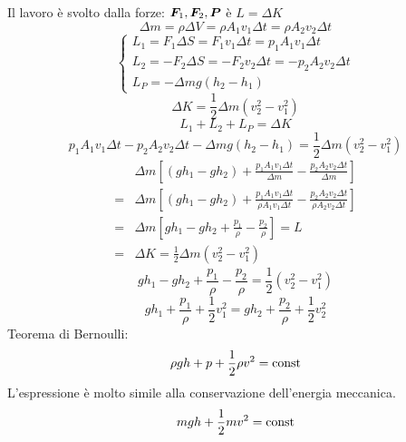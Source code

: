 Il lavoro è svolto dalla forze: $\boldsymbol{F}_1, \boldsymbol{F}_2, \boldsymbol{P}$ è $L=\Delta K$
\begin{equation*}\Delta m=\rho \Delta V=\rho A_1 v_1\Delta t=\rho A_2 v_2 \Delta t\end{equation*}
\begin{equation*}
\left\{
        \begin{array}{lll}
        L_1=F_1\Delta S=F_1v_1\Delta t=p_1A_1v_1\Delta t\\
        L_2=-F_2\Delta S=-F_2v_2\Delta t=-p_2A_2v_2\Delta t\\
        L_P=-\Delta mg(h_2-h_1)
        \end{array}
\right.
\end{equation*}
\begin{equation*}\Delta K=\frac{1}{2}\Delta m(v_2^2-v_1^2)\end{equation*}
\begin{equation*}L_1+L_2+L_P=\Delta K\end{equation*}
\begin{equation*}p_1A_1v_1\Delta t-p_2A_2v_2\Delta t-\Delta mg(h_2-h_1)=\frac{1}{2}\Delta m(v_2^2-v_1^2)\end{equation*}
\begin{align*}
&\Delta m\left[\left(gh_1-gh_2\right)+\frac{p_1A_1v_1\Delta t}{\Delta m}-\frac{p_2A_2v_2\Delta t}{\Delta m}\right]\\
=&\Delta m\left[\left(gh_1-gh_2\right)+\frac{p_1A_1v_1\Delta t}{\rho A_1v_1\Delta t}-\frac{p_2A_2v_2\Delta t}{\rho A_2v_2\Delta t}\right]\\
=&\Delta m\left[gh_1-gh_2+\frac{p_1}{\rho}-\frac{p_2}{\rho}\right]=L\\
=&\Delta K=\frac{1}{2}\Delta m(v_2^2-v_1^2)
\end{align*}
\begin{equation*}gh_1-gh_2+\frac{p_1}{\rho}-\frac{p_2}{\rho}=\frac{1}{2}(v_2^2-v_1^2)\end{equation*}
\begin{equation*}gh_1+\frac{p_1}{\rho}+\frac{1}{2}v_1^2=gh_2+\frac{p_2}{\rho}+\frac{1}{2}v_2^2\end{equation*}
Teorema di Bernoulli:
\begin{equation*}\rho gh+p+\frac{1}{2}\rho v^2=\text{const}\end{equation*}
L'espressione è molto simile alla conservazione dell'energia meccanica.
\begin{equation*}mgh+\frac{1}{2}mv^2=\text{const}\end{equation*}

